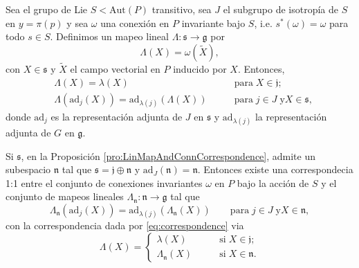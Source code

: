 \begin{pro}
\label{pro:LinMapAndConnCorrespondence}
Sea el grupo de Lie $S < \mathrm{Aut} (P)$ transitivo, sea $J$ el subgrupo de isotrop\'{i}a de $S$ en $y = \pi(p)$ y sea $\omega$ una conexi\'{o}n en $P$ invariante bajo $S$, i.e. $s^{*}(\omega) = \omega$ para todo $s \in S$. Definimos un mapeo lineal $\Lambda: \mathfrak{s} \longrightarrow \mathfrak{g}$ por
%
\begin{equation}
\label{eq:correspondence}
\Lambda (X) = \omega (\tilde{X}),
\end{equation}
%
con $X \in \mathfrak{s}$ y $\tilde{X}$ el campo vectorial en $P$ inducido por $X$. Entonces,
%
\begin{align}
\label{eq:LambdaCond1}
& \Lambda (X) = \lambda (X) & \mathrm{para} \; X \in \mathfrak{j}; \\
\label{eq:LambdaCond2}
& \Lambda (\mathrm{ad}_{j} (X)) = \mathrm{ad}_{\lambda (j)} (\Lambda (X)) \qquad & \mathrm{para} \; j \in J \; \mathrm{y} X \in \mathfrak{s},
\end{align}
%
donde $\mathrm{ad}_{j}$ es la representaci\'{o}n adjunta de $J$ en $\mathfrak{s}$ y $\mathrm{ad}_{\lambda (j)}$ la representaci\'{o}n adjunta de $G$ en $\mathfrak{g}$.
\end{pro}


\begin{thm}
\label{thm:reductive}
Si $\mathfrak{s}$, en la Proposici\'{o}n \autoref{pro:LinMapAndConnCorrespondence}, admite un subespacio $\mathfrak{n}$ tal que $\mathfrak{s} = \mathfrak{j} \oplus \mathfrak{n}$ y $\mathrm{ad}_{J} (\mathfrak{n}) = \mathfrak{n}$. Entonces existe una correspondecia 1:1 entre el conjunto de conexiones invariantes $\omega$ en $P$ bajo la acci\'{o}n de $S$ y el conjunto de mapeos lineales $\Lambda_{\mathfrak{n}}: \mathfrak{n} \longrightarrow \mathfrak{g}$ tal que
%
\begin{equation}
\label{eq:HiggsField}
\Lambda_{\mathfrak{n}} (\mathrm{ad}_{j} (X)) = \mathrm{ad}_{\lambda (j)} (\Lambda_{\mathfrak{n}} (X)) \qquad \mathrm{para} \; j \in J \; \mathrm{y} X \in \mathfrak{n},
\end{equation}
%
con la correspondencia dada por \eqref{eq:correspondence} via
%
$$
\Lambda (X) = 
\begin{cases}
\lambda (X) \qquad & \mathrm{si} \; X\in \mathfrak{j}; \\
\Lambda_{\mathfrak{n}} (X) \qquad & \mathrm{si} \; X \in \mathfrak{n}.
\end{cases}
$$
%
\end{thm}

